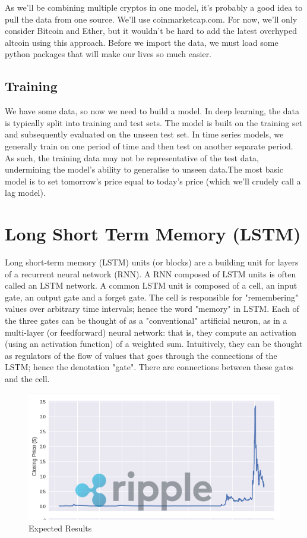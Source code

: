     As we’ll be combining multiple cryptos in one model, it’s probably a good idea to pull the data from one source. We’ll use coinmarketcap.com. For now, we’ll only consider Bitcoin and Ether, but it wouldn’t be hard to add the latest overhyped altcoin using this approach. Before we import the data, we must load some python packages that will make our lives so much easier.
    
    \subsection{Training}
    We have some data, so now we need to build a model. In deep learning, the data is typically split into training and test sets. The model is built on the training set and subsequently evaluated on the unseen test set. In time series models, we generally train on one period of time and then test on another separate period. 
    As such, the training data may not be representative of the test data, undermining the model’s ability to generalise to unseen data.The most basic model is to set tomorrow’s price equal to today’s price (which we’ll crudely call a lag model). 

    \section{Long Short Term Memory (LSTM)}
    Long short-term memory (LSTM) units (or blocks) are a building unit for layers of a recurrent neural network (RNN). A RNN composed of LSTM units is often called an LSTM network. A common LSTM unit is composed of a cell, an input gate, an output gate and a forget gate. The cell is responsible for "remembering" values over arbitrary time intervals; hence the word "memory" in LSTM. Each of the three gates can be thought of as a "conventional" artificial neuron, as in a multi-layer (or feedforward) neural network: that is, they compute an activation (using an activation function) of a weighted sum. Intuitively, they can be thought as regulators of the flow of values that goes through the connections of the LSTM; hence the denotation "gate". There are connections between these gates and the cell.
    \begin{figure}[ht]
        \centering \includegraphics[scale=0.7]{images/lstm.png}
        \caption{Expected Results}
    \end{figure}